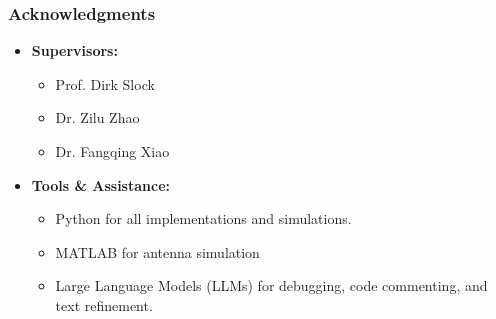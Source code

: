\documentclass{beamer}
\begin{document}
\begin{frame}
    \frametitle{Acknowledgments}
    \begin{itemize}
        \item \textbf{Supervisors:}
        \begin{itemize}
            \item Prof. Dirk Slock
            \item Dr. Zilu Zhao
            \item Dr. Fangqing Xiao
        \end{itemize}
        \item \textbf{Tools \& Assistance:}
        \begin{itemize}
            \item Python for all implementations and simulations.
            \item MATLAB for antenna simulation
            \item Large Language Models (LLMs) for debugging, code commenting, and text refinement.
        \end{itemize}
    \end{itemize}
\end{frame}
\end{document}
